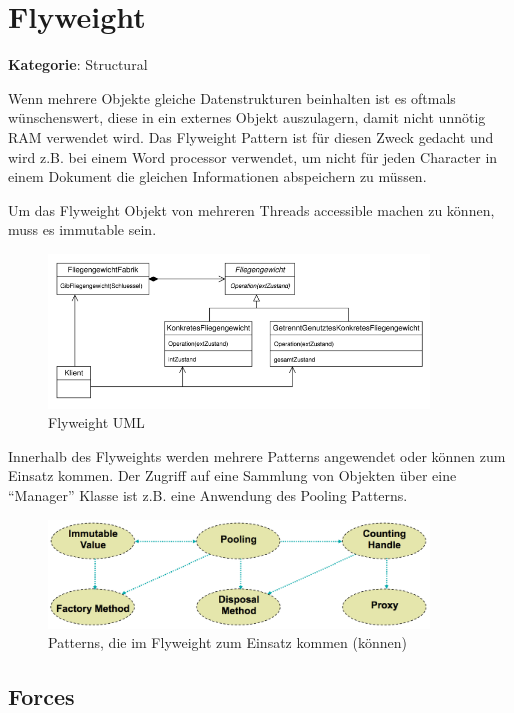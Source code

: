 \section{Flyweight}
\textbf{Kategorie}: Structural

Wenn mehrere Objekte gleiche Datenstrukturen beinhalten ist es oftmals wünschenswert, diese in ein externes Objekt auszulagern, damit nicht unnötig RAM verwendet wird. Das Flyweight Pattern ist für diesen Zweck gedacht und wird z.B. bei einem Word processor verwendet, um nicht für jeden Character in einem Dokument die gleichen Informationen abspeichern zu müssen.

Um das Flyweight Objekt von mehreren Threads accessible machen zu können, muss es immutable sein.

\begin{figure}[H]
	\centering
	\includegraphics[width=0.9\textwidth]{content/gof/images/09-flyweight-uml.png}
	\caption{Flyweight UML}
\end{figure}

Innerhalb des Flyweights werden mehrere Patterns angewendet oder können zum Einsatz kommen. Der Zugriff auf eine Sammlung von Objekten über eine ``Manager'' Klasse ist z.B. eine Anwendung des Pooling Patterns.

\begin{figure}[H]
	\centering
	\includegraphics[width=0.9\textwidth]{content/gof/images/09-flyweight-subpatterns.png}
	\caption{Patterns, die im Flyweight zum Einsatz kommen (können)}
\end{figure}

\subsection*{Forces}

